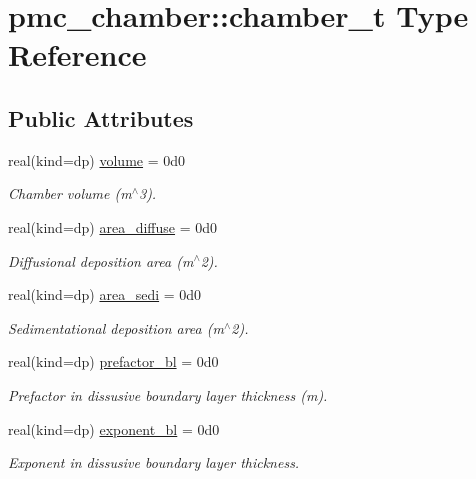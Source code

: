 \hypertarget{structpmc__chamber_1_1chamber__t}{}\section{pmc\+\_\+chamber\+:\+:chamber\+\_\+t Type Reference}
\label{structpmc__chamber_1_1chamber__t}
\subsection*{Public Attributes}
\begin{DoxyCompactItemize}
\item 
real(kind=dp) \mbox{\hyperlink{structpmc__chamber_1_1chamber__t_ac80cf7de556630da110cf01d16313216}{volume}} = 0d0
\begin{DoxyCompactList}\small\item\em Chamber volume (m$^\wedge$3). \end{DoxyCompactList}\item 
real(kind=dp) \mbox{\hyperlink{structpmc__chamber_1_1chamber__t_a05d59e7b12c9a06f681ae2a153ed0978}{area\+\_\+diffuse}} = 0d0
\begin{DoxyCompactList}\small\item\em Diffusional deposition area (m$^\wedge$2). \end{DoxyCompactList}\item 
real(kind=dp) \mbox{\hyperlink{structpmc__chamber_1_1chamber__t_a46c7bb16c0f3945e034b2a3a5ec58afc}{area\+\_\+sedi}} = 0d0
\begin{DoxyCompactList}\small\item\em Sedimentational deposition area (m$^\wedge$2). \end{DoxyCompactList}\item 
real(kind=dp) \mbox{\hyperlink{structpmc__chamber_1_1chamber__t_aeb404a20867090627a86dca9b82a97ca}{prefactor\+\_\+bl}} = 0d0
\begin{DoxyCompactList}\small\item\em Prefactor in dissusive boundary layer thickness (m). \end{DoxyCompactList}\item 
real(kind=dp) \mbox{\hyperlink{structpmc__chamber_1_1chamber__t_a588cbe9d8c76d7f7f7317603b1437f67}{exponent\+\_\+bl}} = 0d0
\begin{DoxyCompactList}\small\item\em Exponent in dissusive boundary layer thickness. \end{DoxyCompactList}\end{DoxyCompactItemize}


